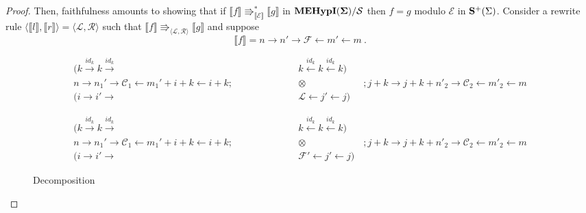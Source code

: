 \begin{proof}
    Then, faithfulness amounts to showing that if $\llbracket f \rrbracket \Rrightarrow_{\llbracket \mathcal{E} \rrbracket}^{*} \llbracket g \rrbracket$ in ${\mathbf{MEHypI(\Sigma)}} / \mathcal{S}$ then $f = g$ modulo $\mathcal{E}$ in $\mathbf{S}^{+}(\Sigma)$.
Consider a rewrite rule $\langle \llbracket l \rrbracket, \llbracket r \rrbracket \rangle = \langle \mathcal{L}, \mathcal{R} \rangle$ such that $\llbracket f \rrbracket \Rrightarrow_{\langle \mathcal{L}, \mathcal{R} \rangle} \llbracket g \rrbracket$ and suppose
\[
	\llbracket f \rrbracket = n \xrightarrow{} n' \xrightarrow{} \mathcal{F} \xleftarrow{} m' \xleftarrow{} m ~.
\]

\begin{figure*}
    \begin{subfigure}{\linewidth}
\begin{align*}
    (k \xrightarrow{id_{k}} k \xrightarrow{id_{k}} &k \xleftarrow{id_{k}} k \xleftarrow{id_{k}} k)\\
    n \xrightarrow{} n_{1}' \xrightarrow{} \mathcal{C}_{1} \xleftarrow{} m_{1}' + i + k \xleftarrow{} i + k; \qquad\qquad\qquad &\otimes \qquad\qquad\qquad ; j + k \xrightarrow{} j + k + n'_{2} \xrightarrow{} \mathcal{C}_{2} \xleftarrow{} m'_{2} \xleftarrow{} m\\
    (i \xrightarrow{} i' \xrightarrow{} &\mathcal{L} \xleftarrow{} j' \xleftarrow{} j)
\end{align*}
\subcaption{\;}
\end{subfigure}
\vspace{1ex}
\begin{subfigure}{\linewidth}
    \begin{align*}
        (k \xrightarrow{id_{k}} k \xrightarrow{id_{k}} &k \xleftarrow{id_{k}} k \xleftarrow{id_{k}} k)\\
        n \xrightarrow{} n_{1}' \xrightarrow{} \mathcal{C}_{1} \xleftarrow{} m_{1}' + i + k \xleftarrow{} i + k; \qquad\qquad\qquad &\otimes \qquad\qquad\qquad ; j + k \xrightarrow{} j + k + n'_{2} \xrightarrow{} \mathcal{C}_{2} \xleftarrow{} m'_{2} \xleftarrow{} m\\
        (i \xrightarrow{} i' \xrightarrow{} &\mathcal{F'} \xleftarrow{} j' \xleftarrow{} j)
    \end{align*}
\subcaption{\;}
\end{subfigure}
\caption{Decomposition}
\label{fig:decomposition_1}
\end{figure*}



\end{proof}
